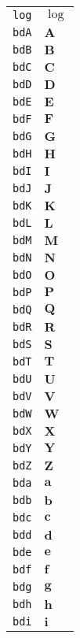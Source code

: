 \begin{longtable}{ll}
\texttt{log}&${}\log {}$\\
\texttt{bdA}&${}{\textbf{A}}{}$\\
\texttt{bdB}&${}{\textbf{B}}{}$\\
\texttt{bdC}&${}{\textbf{C}}{}$\\
\texttt{bdD}&${}{\textbf{D}}{}$\\
\texttt{bdE}&${}{\textbf{E}}{}$\\
\texttt{bdF}&${}{\textbf{F}}{}$\\
\texttt{bdG}&${}{\textbf{G}}{}$\\
\texttt{bdH}&${}{\textbf{H}}{}$\\
\texttt{bdI}&${}{\textbf{I}}{}$\\
\texttt{bdJ}&${}{\textbf{J}}{}$\\
\texttt{bdK}&${}{\textbf{K}}{}$\\
\texttt{bdL}&${}{\textbf{L}}{}$\\
\texttt{bdM}&${}{\textbf{M}}{}$\\
\texttt{bdN}&${}{\textbf{N}}{}$\\
\texttt{bdO}&${}{\textbf{O}}{}$\\
\texttt{bdP}&${}{\textbf{P}}{}$\\
\texttt{bdQ}&${}{\textbf{Q}}{}$\\
\texttt{bdR}&${}{\textbf{R}}{}$\\
\texttt{bdS}&${}{\textbf{S}}{}$\\
\texttt{bdT}&${}{\textbf{T}}{}$\\
\texttt{bdU}&${}{\textbf{U}}{}$\\
\texttt{bdV}&${}{\textbf{V}}{}$\\
\texttt{bdW}&${}{\textbf{W}}{}$\\
\texttt{bdX}&${}{\textbf{X}}{}$\\
\texttt{bdY}&${}{\textbf{Y}}{}$\\
\texttt{bdZ}&${}{\textbf{Z}}{}$\\
\texttt{bda}&${}{\textbf{a}}{}$\\
\texttt{bdb}&${}{\textbf{b}}{}$\\
\texttt{bdc}&${}{\textbf{c}}{}$\\
\texttt{bdd}&${}{\textbf{d}}{}$\\
\texttt{bde}&${}{\textbf{e}}{}$\\
\texttt{bdf}&${}{\textbf{f}}{}$\\
\texttt{bdg}&${}{\textbf{g}}{}$\\
\texttt{bdh}&${}{\textbf{h}}{}$\\
\texttt{bdi}&${}{\textbf{i}}{}$\\

\end{longtable}

